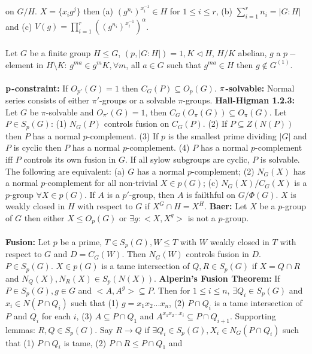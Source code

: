 on $G/H$.
$X= \{ x_i g^j \}$ 
then (a) $(g^{n_i})^{x_i^{-1}} \in H$ for $1 \le i \le r$, (b) $\sum_{i=1}^r n_i= |G:H|$ and
(c) $V(g) = \prod_{i=1}^r ((g^{n_i})^{x_i^{-1}})^{\alpha}$.\\
\\
Let $G$ be a finite group $H \le G$, $(p, |G:H|)=1, K \lhd H$, $H/K$ abelian,
$g$ a $p-$element in $H \setminus K$: $g^{ma} \in g^m K, \forall m$, all $a \in G$ such that
$g^{ma} \in H$ then $g \notin G^{(1)}$.\\
\\
${\bf p}${\bf -constraint:}  If $O_{p'}(G)=1$ then $C_G(P) \subseteq O_p(G)$.
${\bf \pi}${\bf -solvable:}  Normal series consists of either $\pi'$-groups or a solvable
$\pi$-groups.  {\bf Hall-Higman 1.2.3:}  Let $G$ be $\pi$-solvable and $O_{\pi'}(G)=1$, then
$C_G(O_{\pi}(G)) \subseteq O_{\pi}(G)$.  Let $P \in S_p(G)$:
(1) $N_G(P)$ controls fusion on $C_G(P)$.  
(2) If $P \subseteq Z(N(P))$ then $P$ has a normal $p$-complement.
(3) If $p$ is the smallest prime dividing $|G|$
and $P$ is cyclic then $P$ has a normal $p$-complement.
(4) $P$ has a normal $p$-complement iff $P$ controls its own fusion in $G$.
If all sylow subgroups are cyclic, $P$ is solvable.  The following are equivalent:
(a) $G$ has a normal $p$-complement; (2) $N_G(X)$ has a normal
$p$-complement for all non-trivial $X \in p(G)$;
(c) $N_G(X)/C_G(X)$ is a $p$-group $\forall X \in p(G)$.  If $A$ is a $p'$-group,
then $A$ is failthful on $G/\Phi(G)$.  $X$ is weakly closed in $H$ with respect to $G$ if
$X^G \cap H = X^H$.  {\bf Baer:} Let $X$ be a $p$-group of $G$ then either
$X \le O_p(G)$ or $\exists g: <X, X^g>$ is not a $p$-group.
\\
\\
{\bf Fusion:}
Let $p$ be a prime, $T \in S_p(G), W \le T$ with $W$ weakly closed in $T$ with respect
to $G$ and $D=C_G (W)$.  Then $N_G(W)$ controls fusion in $D$.
$P \in S_p(G)$.  $X \in p(G)$ is a tame intersection of
$Q, R \in S_p (G)$ if $X= Q \cap R$ and $N_Q (X), N_R (X) \in S_p(N(X))$.
{\bf Alperin's Fusion Theorem:}
If $P \in S_p(G), g \in G$ and $<A, A^g> \subseteq P$.  Then 
for $1 \le i \le n$, $\exists Q_i \in S_p (G)$ and $x_i \in N(P \cap Q_i)$ such
that (1) $g= x_1 x_2 ... x_n$,
(2) $P \cap Q_i$ is a tame intersection of $P$ and $Q_i$ for each $i$,
(3) $A \subseteq P \cap Q_1$ and
$A^{x_1 x_2 ... x_i} \subseteq P \cap Q_{i+1}$.  Supporting lemmas:
$R,Q \in S_p(G)$.  Say $R \rightarrow Q$ if 
$\exists Q_i \in S_p(G), X_i \in N_G(P \cap Q_i )$
such that (1) $P \cap Q_i$ is tame, (2) $P \cap R \le P \cap Q_1$ and
